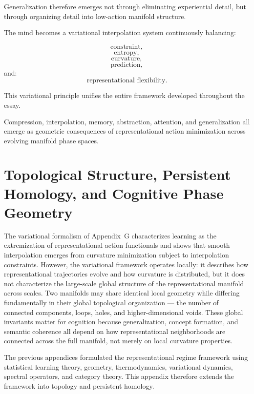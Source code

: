 \documentclass[12pt,a4paper]{article}
\begin{document}
Generalization therefore emerges not through eliminating experiential detail, but through organizing detail into low-action manifold structure.

The mind becomes a variational interpolation system continuously balancing:

\[
\text{constraint},
\]
\[
\text{entropy},
\]
\[
\text{curvature},
\]
\[
\text{prediction},
\]
and:
\[
\text{representational flexibility}.
\]

This variational principle unifies the entire framework developed throughout the essay.

Compression, interpolation, memory, abstraction, attention, and generalization all emerge as geometric consequences of representational action minimization across evolving manifold phase spaces.


\section{Topological Structure, Persistent Homology, and Cognitive Phase Geometry}

The variational formalism of Appendix~G characterizes learning as the extremization of representational action functionals and shows that smooth interpolation emerges from curvature minimization subject to interpolation constraints. However, the variational framework operates locally: it describes how representational trajectories evolve and how curvature is distributed, but it does not characterize the large-scale global structure of the representational manifold across scales. Two manifolds may share identical local geometry while differing fundamentally in their global topological organization --- the number of connected components, loops, holes, and higher-dimensional voids. These global invariants matter for cognition because generalization, concept formation, and semantic coherence all depend on how representational neighborhoods are connected across the full manifold, not merely on local curvature properties.

The previous appendices formulated the representational regime framework using statistical learning theory, geometry, thermodynamics, variational dynamics, spectral operators, and category theory. This appendix therefore extends the framework into topology and persistent homology.
\end{document}

